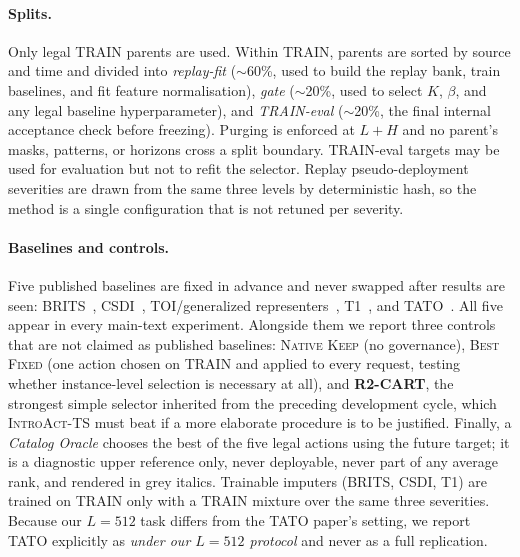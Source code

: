 \documentclass{article}
\newcommand{\introact}{\textsc{IntroAct-TS}}
\begin{document}
\paragraph{Splits.}
Only legal TRAIN parents are used. Within TRAIN, parents are sorted by source and time and
divided into \emph{replay-fit} ($\sim$60\%, used to build the replay bank, train
baselines, and fit feature normalisation), \emph{gate} ($\sim$20\%, used to select $K$,
$\beta$, and any legal baseline hyperparameter), and \emph{TRAIN-eval} ($\sim$20\%, the
final internal acceptance check before freezing). Purging is enforced at $L + H$ and no
parent's masks, patterns, or horizons cross a split boundary. TRAIN-eval targets may be
used for evaluation but not to refit the selector. Replay pseudo-deployment severities are
drawn from the same three levels by deterministic hash, so the method is a single
configuration that is not retuned per severity.

\paragraph{Baselines and controls.}
Five published baselines are fixed in advance and never swapped after results are seen:
BRITS~\citep{cao2018brits}, CSDI~\citep{tashiro2021csdi}, TOI/generalized
representers~\citep{wang2024taskoriented}, T1~\citep{park2026t1}, and
TATO~\citep{qiu2026tato}. All five appear in every main-text experiment. Alongside them we
report three controls that are not claimed as published baselines: \textsc{Native Keep}
(no governance), \textsc{Best Fixed} (one action chosen on TRAIN and applied to every
request, testing whether instance-level selection is necessary at all), and
\textbf{R2-CART}, the strongest simple selector inherited from the preceding development
cycle, which \introact{} must beat if a more elaborate procedure is to be justified.
Finally, a \emph{Catalog Oracle} chooses the best of the five legal actions using the
future target; it is a diagnostic upper reference only, never deployable, never part of
any average rank, and rendered in grey italics. Trainable imputers (BRITS, CSDI, T1) are
trained on TRAIN only with a TRAIN mixture over the same three severities. Because our
$L = 512$ task differs from the TATO paper's setting, we report TATO explicitly as
\emph{under our $L{=}512$ protocol} and never as a full replication.
\end{document}
